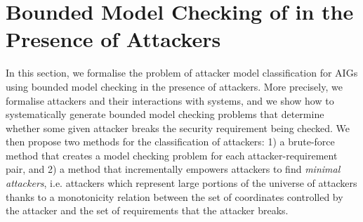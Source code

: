 \section{Bounded Model Checking of in the Presence of Attackers}
\label{sec:bmc}
In this section, we %
formalise the problem of attacker model classification for AIGs using bounded model checking in the presence of attackers. More precisely, %
we formalise attackers and their interactions with systems, and we show how to systematically generate bounded model checking problems that determine whether some given attacker breaks the security requirement being checked. We then propose two methods for the classification of attackers: 1) a brute-force method that creates a model checking problem for each attacker-requirement pair, and 2) a method that incrementally empowers attackers to find \emph{minimal attackers}, i.e. attackers which represent large portions of the universe of attackers thanks to a monotonicity relation between the set of coordinates controlled by the attacker and the set of requirements that the attacker breaks. %

